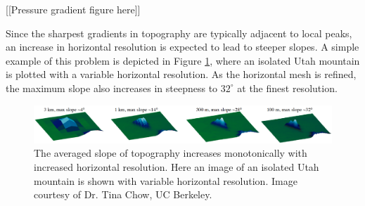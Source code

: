 \documentclass[11pt]{article}
\begin{document}
{\color{red} [[Pressure gradient figure here]]}

Since the sharpest gradients in topography are typically adjacent to local peaks, an increase in horizontal resolution is expected to lead to steeper slopes.  A simple example of this problem is depicted in Figure \ref{fig:MountainSlopeResolution}, where an isolated Utah mountain is plotted with a variable horizontal resolution.  As the horizontal mesh is refined, the maximum slope also increases in steepness to $32^\circ$ at the finest resolution.



\begin{figure}
\begin{center}
\includegraphics[width=6.5in]{MountainSlopeResolutionLong.png}
\end{center}
\caption{The averaged slope of topography increases monotonically with increased horizontal resolution.  Here an image of an isolated Utah mountain is shown with variable horizontal resolution.  Image courtesy of Dr. Tina Chow, UC Berkeley.} \label{fig:MountainSlopeResolution}
\end{figure}
\end{document}
